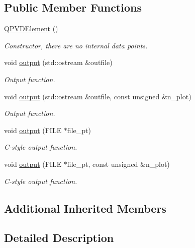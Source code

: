 \subsection*{Public Member Functions}
\begin{DoxyCompactItemize}
\item 
\hyperlink{classoomph_1_1QPVDElement_a892b8c37cf64adffc8fedff55a13d1d1}{Q\+P\+V\+D\+Element} ()
\begin{DoxyCompactList}\small\item\em Constructor, there are no internal data points. \end{DoxyCompactList}\item 
void \hyperlink{classoomph_1_1QPVDElement_a038336073cf2e0ffb368e2c95feab324}{output} (std\+::ostream \&outfile)
\begin{DoxyCompactList}\small\item\em Output function. \end{DoxyCompactList}\item 
void \hyperlink{classoomph_1_1QPVDElement_a15611416b32a40e0aa67261e8c0a1188}{output} (std\+::ostream \&outfile, const unsigned \&n\+\_\+plot)
\begin{DoxyCompactList}\small\item\em Output function. \end{DoxyCompactList}\item 
void \hyperlink{classoomph_1_1QPVDElement_a5955081a120c29aafbfc23a3b40b0c12}{output} (F\+I\+LE $\ast$file\+\_\+pt)
\begin{DoxyCompactList}\small\item\em C-\/style output function. \end{DoxyCompactList}\item 
void \hyperlink{classoomph_1_1QPVDElement_a063b9d709dc2476ed53c9a6ca7d7af22}{output} (F\+I\+LE $\ast$file\+\_\+pt, const unsigned \&n\+\_\+plot)
\begin{DoxyCompactList}\small\item\em C-\/style output function. \end{DoxyCompactList}\end{DoxyCompactItemize}
\subsection*{Additional Inherited Members}


\subsection{Detailed Description}
